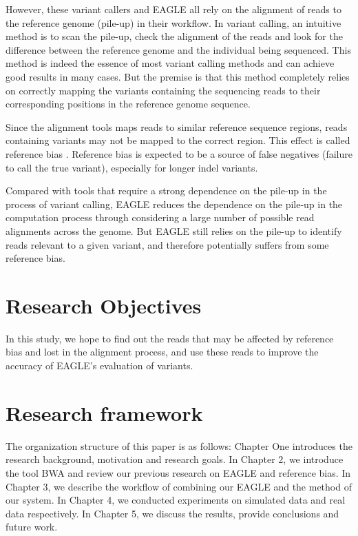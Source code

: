 However, these variant callers and EAGLE all rely on the alignment of reads to the reference genome (pile-up) in their workflow. In variant calling, an intuitive method is to scan the pile-up, check the alignment of the reads and look for the difference between the reference genome and the individual being sequenced. This method is indeed the essence of most variant calling methods and can achieve good results in many cases. But the premise is that this method completely relies on correctly mapping the variants containing the sequencing reads to their corresponding positions in the reference genome sequence. 

Since the alignment tools maps reads to similar reference sequence regions, reads containing variants may not be mapped to the correct region. This effect is called reference bias \cite{sousa2013understanding}. Reference bias is expected to be a source of false negatives (failure to call the true variant), especially for longer indel variants.

Compared with tools that require a strong dependence on the pile-up in the process of variant calling, EAGLE reduces the dependence on the pile-up in the computation process through considering a large number of possible read alignments across the genome.  But EAGLE still relies on the pile-up to identify reads relevant to a given variant, and therefore potentially suffers from some reference bias.

\section{Research Objectives}		
In this study, we hope to find out the reads that may be affected by reference bias and lost in the alignment process, and use these reads to improve the accuracy of EAGLE's evaluation of variants.

\section{Research framework}
The organization structure of this paper is as follows: Chapter One introduces the research background, motivation and research goals. In Chapter 2, we introduce the tool BWA and review our previous research on EAGLE and reference bias. In Chapter 3, we describe the workflow of combining our EAGLE and the method of our system. In Chapter 4, we conducted experiments on simulated data and real data respectively. In Chapter 5, we discuss the results, provide conclusions and future work.
